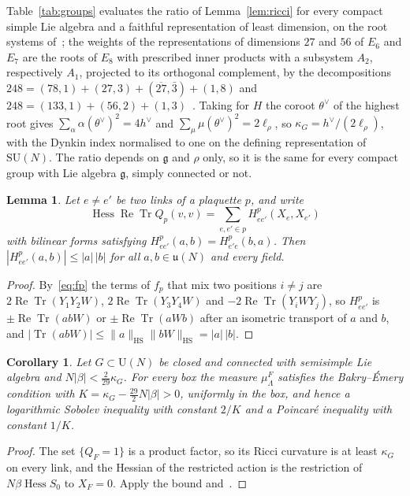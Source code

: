 \documentclass[11pt]{amsart}
\newtheorem{lemma}[theorem]{Lemma}
\newtheorem{corollary}[theorem]{Corollary}
\theoremstyle{definition}
\theoremstyle{remark}
\numberwithin{equation}{section}
\newcommand{\SU}{\mathrm{SU}}
\newcommand{\U}{\mathrm{U}}
\newcommand{\g}{\mathfrak{g}}
\newcommand{\Tr}{\operatorname{Tr}}
\newcommand{\ReTr}{\operatorname{Re}\operatorname{Tr}}
\newcommand{\Hess}{\operatorname{Hess}}
\begin{document}
Table~\ref{tab:groups} evaluates the ratio of Lemma~\ref{lem:ricci} for
every compact simple Lie algebra and a faithful representation of least
dimension, on the root systems of~\cite[Sect.~12.1]{Hum72}; the weights of
the representations of dimensions $27$ and $56$ of $E_6$ and $E_7$ are the
roots of $E_8$ with prescribed inner products with a subsystem $A_2$,
respectively $A_1$, projected to its orthogonal complement, by the
decompositions $248=(78,1)+(27,3)+(\overline{27},\bar3)+(1,8)$ and
$248=(133,1)+(56,2)+(1,3)$~\cite{Sla81}. Taking for $H$ the coroot
$\theta^\vee$ of the highest root gives $\sum_\alpha\alpha(\theta^\vee)^2=4h^\vee$
and $\sum_\mu\mu(\theta^\vee)^2=2\ell_\rho$, so $\kappa_G=h^\vee/(2\ell_\rho)$, with
the Dynkin index normalised to one on the defining representation of
$\SU(N)$. The ratio depends on $\g$ and $\rho$ only, so it is the same for
every compact group with Lie algebra $\g$, simply connected or not.

\begin{lemma}\label{lem:mixed}
Let $e\ne e'$ be two links of a plaquette $p$, and write
\[
\Hess\ReTr Q_p(v,v)=\sum_{e,e'\in p}H^p_{ee'}(X_e,X_{e'})
\]
with bilinear forms satisfying $H^p_{ee'}(a,b)=H^p_{e'e}(b,a)$. Then $|H^p_{ee'}(a,b)|\le|a|\,|b|$ for all
$a,b\in\mathfrak u(N)$ and every field.
\end{lemma}

\begin{proof}
By~\eqref{eq:fp} the terms of $f_p$ that mix two positions $i\ne j$ are
$2\ReTr(Y_1Y_2W)$, $2\ReTr(Y_3Y_4W)$ and $-2\ReTr(Y_iWY_j)$, so $H^p_{ee'}$
is $\pm\ReTr(abW)$ or $\pm\ReTr(aWb)$ after an isometric transport of $a$
and $b$, and $|\Tr(abW)|\le\|a\|_{\mathrm{HS}}\|bW\|_{\mathrm{HS}}=|a|\,|b|$.
\end{proof}

\begin{corollary}\label{cor:be}
Let $G\subset\U(N)$ be closed and connected with semisimple Lie algebra and
$N|\beta|<\frac2{29}\kappa_G$. For every box the measure $\mu^F_\Lambda$
satisfies the Bakry--\'Emery condition with $K=\kappa_G-\frac{29}2N|\beta|>0$,
uniformly in the box, and hence a logarithmic Sobolev inequality with
constant $2/K$ and a Poincar\'e inequality with constant $1/K$.
\end{corollary}

\begin{proof}
The set $\{Q_F=1\}$ is a product factor, so its Ricci curvature is at least
$\kappa_G$ on every link, and the Hessian of the restricted action is the
restriction of $N\beta\Hess S_0$ to $X_F=0$. Apply the bound
and~\cite[Cor.~5.7.2]{BGL14}.
\end{proof}
\end{document}
